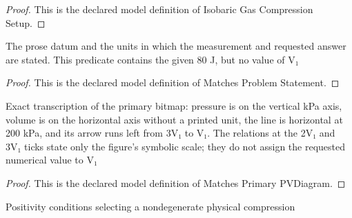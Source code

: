 \begin{proof}
  This is the declared model definition of Isobaric Gas Compression Setup.
\end{proof}
\begin{definition}
  \label{def:physics:phyx-mini-0404:phyxminiproblems-problemphyxmini0404-matchesproblemstatement}
  The prose datum and the units in which the measurement and requested answer are stated. This predicate contains the given 80 J, but no value of V₁
\end{definition}
\begin{proof}
  This is the declared model definition of Matches Problem Statement.
\end{proof}
\begin{definition}
  \label{def:physics:phyx-mini-0404:phyxminiproblems-problemphyxmini0404-matchesprimarypvdiagram}
  Exact transcription of the primary bitmap: pressure is on the vertical kPa axis, volume is on the horizontal axis without a printed unit, the line is horizontal at 200 kPa, and its arrow runs left from 3V₁ to V₁. The relations at the 2V₁ and 3V₁ ticks state only the figure's symbolic scale; they do not assign the requested numerical value to V₁
\end{definition}
\begin{proof}
  This is the declared model definition of Matches Primary PVDiagram.
\end{proof}
\begin{definition}
  \label{def:physics:phyx-mini-0404:phyxminiproblems-problemphyxmini0404-hasphysicalcompressionparameters}
  Positivity conditions selecting a nondegenerate physical compression
\end{definition}
